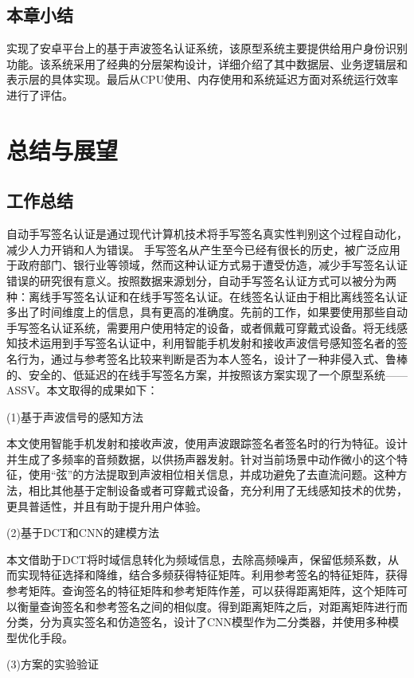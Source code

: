 \section{本章小结}
实现了安卓平台上的基于声波签名认证系统，该原型系统主要提供给用户身份识别功能。该系统采用了经典的分层架构设计，详细介绍了其中数据层、业务逻辑层和表示层的具体实现。最后从CPU使用、内存使用和系统延迟方面对系统运行效率进行了评估。

\chapter{总结与展望}

\section{工作总结}

自动手写签名认证是通过现代计算机技术将手写签名真实性判别这个过程自动化，减少人力开销和人为错误。 手写签名从产生至今已经有很长的历史，被广泛应用于政府部门、银行业等领域，然而这种认证方式易于遭受仿造，减少手写签名认证错误的研究很有意义。按照数据来源划分，自动手写签名认证方式可以被分为两种：离线手写签名认证和在线手写签名认证。在线签名认证由于相比离线签名认证多出了时间维度上的信息，具有更高的准确度。先前的工作，如果要使用那些自动手写签名认证系统，需要用户使用特定的设备，或者佩戴可穿戴式设备。将无线感知技术运用到手写签名认证中，利用智能手机发射和接收声波信号感知签名者的签名行为，通过与参考签名比较来判断是否为本人签名，设计了一种非侵入式、鲁棒的、安全的、低延迟的在线手写签名方案，并按照该方案实现了一个原型系统——ASSV。本文取得的成果如下：

(1)基于声波信号的感知方法

本文使用智能手机发射和接收声波，使用声波跟踪签名者签名时的行为特征。设计并生成了多频率的音频数据，以供扬声器发射。针对当前场景中动作微小的这个特征，使用“弦”的方法提取到声波相位相关信息，并成功避免了去直流问题。这种方法，相比其他基于定制设备或者可穿戴式设备，充分利用了无线感知技术的优势，更具普适性，并且有助于提升用户体验。

(2)基于DCT和CNN的建模方法

本文借助于DCT将时域信息转化为频域信息，去除高频噪声，保留低频系数，从而实现特征选择和降维，结合多频获得特征矩阵。利用参考签名的特征矩阵，获得参考矩阵。查询签名的特征矩阵和参考矩阵作差，可以获得距离矩阵，这个矩阵可以衡量查询签名和参考签名之间的相似度。得到距离矩阵之后，对距离矩阵进行而分类，分为真实签名和仿造签名，设计了CNN模型作为二分类器，并使用多种模型优化手段。

(3)方案的实验验证

